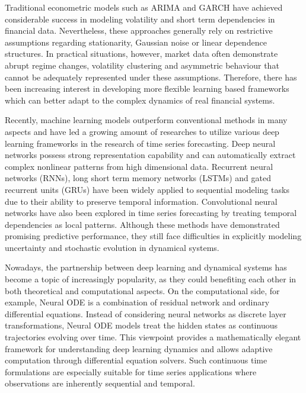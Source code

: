 Traditional econometric models such as ARIMA and GARCH have achieved considerable success in modeling volatility and short term dependencies in financial data. Nevertheless, these approaches generally rely on restrictive assumptions regarding stationarity, Gaussian noise or linear dependence structures. In practical situations, however, market data often demonstrate abrupt regime changes, volatility clustering and asymmetric behaviour that cannot be adequately represented under these assumptions. Therefore, there has been increasing interest in developing more flexible learning based frameworks which can better adapt to the complex dynamics of real financial systems.

Recently, machine learning models outperform conventional methods in many aspects and have led a growing amount of researches to utilize various deep learning frameworks in the research of time series forecasting. Deep neural networks possess strong representation capability and can automatically extract complex nonlinear patterns from high dimensional data. Recurrent neural networks (RNNs), long short term memory networks (LSTMs) and gated recurrent units (GRUs) have been widely applied to sequential modeling tasks due to their ability to preserve temporal information. Convolutional neural networks have also been explored in time series forecasting by treating temporal dependencies as local patterns. Although these methods have demonstrated promising predictive performance, they still face difficulties in explicitly modeling uncertainty and stochastic evolution in dynamical systems.

Nowadays, the partnership between deep learning and dynamical systems has become a topic of increasingly popularity, as they could benefiting each other in both theoretical and computational aspects. On the computational side, for example, Neural ODE \cite{chen2019neuralordinarydifferentialequations} is a combination of residual network and ordinary differential equations. Instead of considering neural networks as discrete layer transformations, Neural ODE models treat the hidden states as continuous trajectories evolving over time. This viewpoint provides a mathematically elegant framework for understanding deep learning dynamics and allows adaptive computation through differential equation solvers. Such continuous time formulations are especially suitable for time series applications where observations are inherently sequential and temporal.

